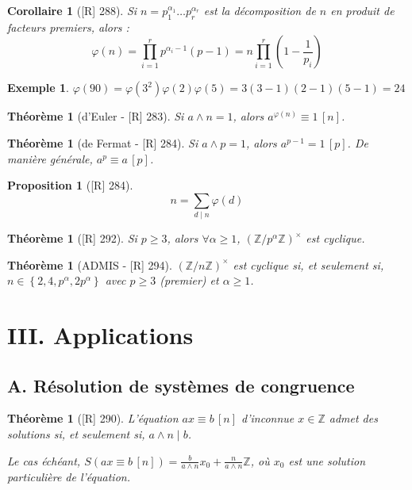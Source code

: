 \documentclass[10pt, a4paper, parskip=full, twoside, twocolumn]{report}
\newtheorem{theorem}[definition]{Théorème}
\newtheorem{proposition}[definition]{Proposition}
\newtheorem{corollary}[definition]{Corollaire}
\newtheorem{example}[definition]{Exemple}
\newcommand{\IZ}{\mathbb{Z}}
\newcommand{\IZnZ}{\mathbb{Z}/n\mathbb{Z}}
\begin{document}
\begin{corollary}[\textnormal{[R] 288}]
	Si $n=p_1^{\alpha_1}\dots p_r^{\alpha_r}$ est la décomposition de $n$ en produit de facteurs premiers,
	alors :
	$$\varphi(n) = \prod_{i=1}^{r} p^{\alpha_i - 1}(p-1) = n\prod_{i=1}^{r}\left(1 - \frac{1}{p_i}\right)$$
\end{corollary}

\begin{example}
	$\varphi(90) = \varphi(3^2)\varphi(2)\varphi(5) = 3(3-1)(2-1)(5-1) = 24$
\end{example}

\begin{theorem}[d'Euler - \textnormal{[R] 283}]
	Si $a\wedge n = 1$, alors $a^{\varphi(n)} \equiv 1\,[n]$.
\end{theorem}

\begin{theorem}[de Fermat - \textnormal{[R] 284}]
	Si $a\wedge p = 1$, alors $a^{p-1} = 1\, [p]$.
	De manière générale, $a^p\equiv a\,[p]$.
\end{theorem}

\begin{proposition}[\textnormal{[R] 284}]
	$$n = \sum_{d\mid n} \varphi(d)$$
\end{proposition}


\begin{tcolorbox}[
    breakable, %
    colback=developpement, %
    colframe=gray!0!black, %
    boxrule=0pt, %
    arc=1mm, %
	boxsep=0pt,
	left=0pt, right=0pt, top=0pt, bottom=0pt
]
\begin{theorem}[\textnormal{[R] 292}]
	\label{120dev2}
	Si $p\geq 3$, alors $\forall \alpha \geq 1$, $\left(\IZ/p^{\alpha}\IZ\right)^{\times}$ est cyclique.
\end{theorem}
\end{tcolorbox}

\begin{theorem}[ADMIS - \textnormal{[R] 294}]
	$\left(\IZnZ\right)^{\times}$ est cyclique si, et seulement si, $n\in \left\{2,4,p^{\alpha}, 2p^{\alpha}\right\}$ avec $p\geq 3$ (premier) et $\alpha\geq 1$.
\end{theorem}

\section*{III. Applications}
\subsection*{A. Résolution de systèmes de congruence}
\begin{theorem}[\textnormal{[R] 290}]
	L'équation $ax\equiv b\,[n]$ d'inconnue $x\in\IZ$ admet des solutions si, et seulement si, $a\wedge n \mid b$.

	Le cas échéant, $S(ax\equiv b\,[n]) = \frac{b}{a\wedge n}x_0 + \frac{n}{a\wedge n}\IZ$, où $x_0$ est une solution particulière de l'équation.
\end{theorem}
\end{document}
